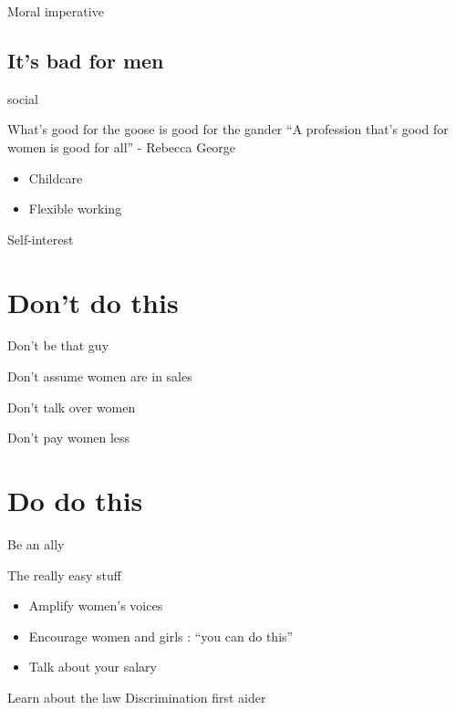 \documentclass[xcolor=table]{beamer}
\begin{document}
\begin{frame}{Moral imperative}
\end{frame}
\subsection{It's bad for men}

\begin{frame}{social}

\end{frame}

\begin{frame}{What's good for the goose is good for the gander}
	``A profession that's good for women is good for all'' - Rebecca George 

	\begin{itemize}
		\item Childcare
		\item Flexible working
	\end{itemize}
\end{frame}

\begin{frame}{Self-interest}

\end{frame}

\section{Don't do this}

\begin{frame}{Don't be that guy}

\end{frame}

\begin{frame}{Don't assume women are in sales}

\end{frame}
\begin{frame}{Don't talk over women}

\end{frame}
\begin{frame}{Don't pay women less}

\end{frame}

\section{Do do this}

\begin{frame}{Be an ally}

\end{frame}
\begin{frame}{The really easy stuff}
	\begin{itemize}
		\item Amplify women's voices
		\item Encourage women and girls : ``you can do this''
		\item Talk about your salary
	\end{itemize}
\end{frame}
\begin{frame}{Learn about the law}
	Discrimination first aider

\end{frame}
\end{document}
